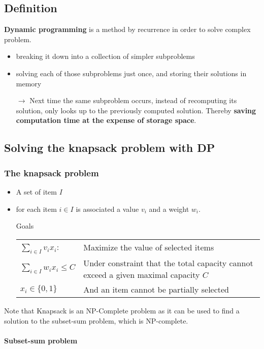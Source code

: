 
\subsection{Definition}

\textbf{Dynamic programming} is a method by recurrence in order to solve complex problem.
\begin{itemize}
    \item breaking it down into a collection of simpler subproblems
    \item solving each of those subproblems just once, and storing their solutions in memory
    \item[$\rightarrow$] Next time the same subproblem occurs, instead of 
recomputing its solution, only looks up to the previously computed solution.
Thereby \textbf{saving computation time at the expense of storage space}.
\end{itemize}

\subsection{Solving the knapsack problem with DP}

\subsubsection{The knapsack problem}
\begin{itemize}
    \item A set of item $I$
    \item for each item $i \in I$ is associated a value $v_i$ and a weight $w_i$.

    \item[Goals] 
        \begin{tabular}{m{3cm}m{12cm}}
            $\sum_{i \in I} v_i x_i$: & Maximize the value of selected items\\
            $\sum_{i \in I} w_i x_i \le C$ & Under constraint that the total
            capacity cannot exceed a given maximal capacity $C$ \\ 
            $x_i \in \{0,1\}$ & And an item cannot be partially selected \\
        \end{tabular}
\end{itemize}

Note that Knapsack is an NP-Complete problem as it can be used
to find a solution to the subset-sum problem, which is NP-complete.

\paragraph{Subset-sum problem}

